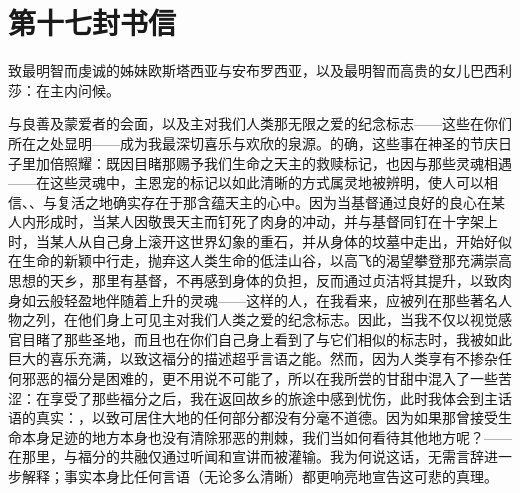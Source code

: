

\section{第十七封书信}

\par

\par

致最明智而虔诚的姊妹欧斯塔西亚与安布罗西亚，以及最明智而高贵的女儿巴西利莎：在主内问候。\par

与良善及蒙爱者的会面，以及主对我们人类那无限之爱的纪念标志——这些在你们所在之处显明——成为我最深切喜乐与欢欣的泉源。的确，这些事在神圣的节庆日子里加倍照耀：既因目睹那赐予我们生命之天主的救赎标记，也因与那些灵魂相遇——在这些灵魂中，主恩宠的标记以如此清晰的方式属灵地被辨明，使人可以相信、、与复活之地确实存在于那含蕴天主的心中。因为当基督通过良好的良心在某人内形成时，当某人因敬畏天主而钉死了肉身的冲动，并与基督同钉在十字架上时，当某人从自己身上滚开这世界幻象的重石，并从身体的坟墓中走出，开始好似在生命的新颖中行走，抛弃这人类生命的低洼山谷，以高飞的渴望攀登那充满崇高思想的天乡，那里有基督，不再感到身体的负担，反而通过贞洁将其提升，以致肉身如云般轻盈地伴随着上升的灵魂——这样的人，在我看来，应被列在那些著名人物之列，在他们身上可见主对我们人类之爱的纪念标志。因此，当我不仅以视觉感官目睹了那些圣地，而且也在你们自己身上看到了与它们相似的标志时，我被如此巨大的喜乐充满，以致这福分的描述超乎言语之能。然而，因为人类享有不掺杂任何邪恶的福分是困难的，更不用说不可能了，所以在我所尝的甘甜中混入了一些苦涩：在享受了那些福分之后，我在返回故乡的旅途中感到忧伤，此时我体会到主话语的真实：，以致可居住大地的任何部分都没有分毫不道德。因为如果那曾接受生命本身足迹的地方本身也没有清除邪恶的荆棘，我们当如何看待其他地方呢？——在那里，与福分的共融仅通过听闻和宣讲而被灌输。我为何说这话，无需言辞进一步解释；事实本身比任何言语（无论多么清晰）都更响亮地宣告这可悲的真理。\par

